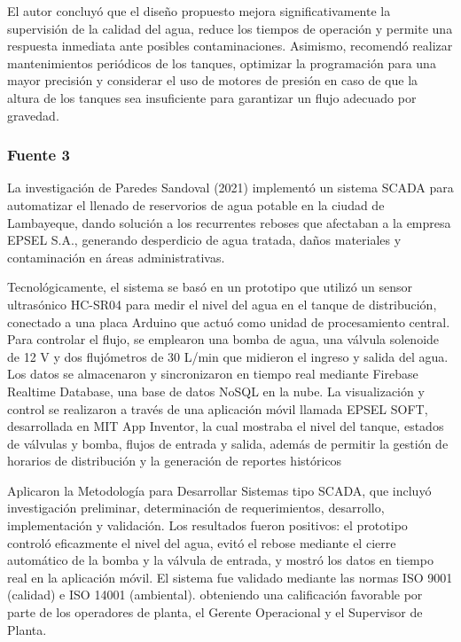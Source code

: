 El autor concluyó que el diseño propuesto mejora significativamente la supervisión de la calidad del agua, reduce los tiempos de operación y permite una respuesta inmediata ante posibles contaminaciones. Asimismo, recomendó realizar mantenimientos periódicos de los tanques, optimizar la programación para una mayor precisión y considerar el uso de motores de presión en caso de que la altura de los tanques sea insuficiente para garantizar un flujo adecuado por gravedad.

\subsubsection{Fuente 3}

La investigación de Paredes Sandoval (2021) \cite{Paredes2021} implementó un sistema SCADA para automatizar el llenado de reservorios de agua potable en la ciudad de Lambayeque, dando solución a los recurrentes reboses que afectaban a la empresa EPSEL S.A., generando desperdicio de agua tratada, daños materiales y contaminación en áreas administrativas.

Tecnológicamente, el sistema se basó en un prototipo que utilizó un sensor ultrasónico HC-SR04 para medir el nivel del agua en el tanque de distribución, conectado a una placa Arduino que actuó como unidad de procesamiento central. Para controlar el flujo, se emplearon una bomba de agua, una válvula solenoide de 12 V y dos flujómetros de 30 L/min que midieron el ingreso y salida del agua. Los datos se almacenaron y sincronizaron en tiempo real mediante Firebase Realtime Database, una base de datos NoSQL en la nube. La visualización y control se realizaron a través de una aplicación móvil llamada EPSEL SOFT, desarrollada en MIT App Inventor, la cual mostraba el nivel del tanque, estados de válvulas y bomba, flujos de entrada y salida, además de permitir la gestión de horarios de distribución y la generación de reportes históricos

Aplicaron la Metodología para Desarrollar Sistemas tipo SCADA, que incluyó investigación preliminar, determinación de requerimientos, desarrollo, implementación y validación. Los resultados fueron positivos: el prototipo controló eficazmente el nivel del agua, evitó el rebose mediante el cierre automático de la bomba y la válvula de entrada, y mostró los datos en tiempo real en la aplicación móvil. El sistema fue validado mediante las normas ISO 9001 (calidad) e ISO 14001 (ambiental). obteniendo una calificación favorable por parte de los operadores de planta, el Gerente Operacional y el Supervisor de Planta.

